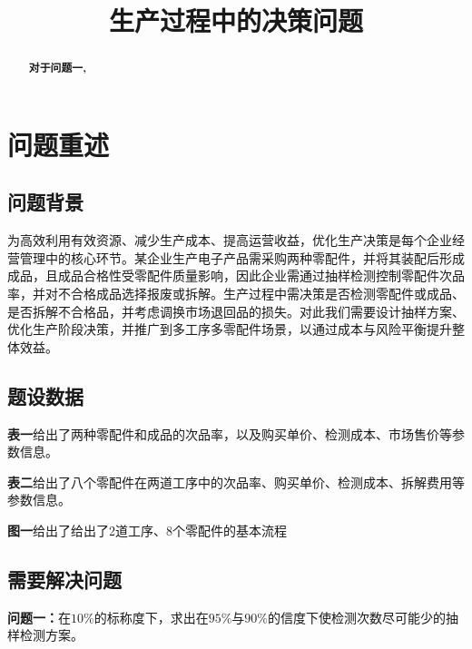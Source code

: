 \documentclass[withoutpreface,bwprint]{cumcmthesis}
\title{生产过程中的决策问题}
\begin{document}
\maketitle
\thispagestyle{empty}
\begin{abstract}



\textbf{对于问题一,}


   \keywords{} 

\end{abstract}


\section{问题重述}

\subsection{问题背景}
为高效利用有效资源、减少生产成本、提高运营收益，优化生产决策是每个企业经营管理中的核心环节。某企业生产电子产品需采购两种零配件，并将其装配后形成成品，且成品合格性受零配件质量影响，因此企业需通过抽样检测控制零配件次品率，并对不合格成品选择报废或拆解。生产过程中需决策是否检测零配件或成品、是否拆解不合格品，并考虑调换市场退回品的损失。对此我们需要设计抽样方案、优化生产阶段决策，并推广到多工序多零配件场景，以通过成本与风险平衡提升整体效益。


\subsection{题设数据}
\textbf{表一}给出了两种零配件和成品的次品率，以及购买单价、检测成本、市场售价等参数信息。

\textbf{表二}给出了八个零配件在两道工序中的次品率、购买单价、检测成本、拆解费用等参数信息。

\textbf{图一}给出了给出了2道工序、8个零配件的基本流程





\subsection{需要解决问题}

\textbf{问题一：}在$10\%$的标称度下，求出在$95\%$与$90\%$的信度下使检测次数尽可能少的抽样检测方案。
\end{document}
